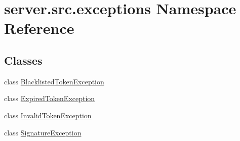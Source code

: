 \hypertarget{namespaceserver_1_1src_1_1exceptions}{}\section{server.\+src.\+exceptions Namespace Reference}
\label{namespaceserver_1_1src_1_1exceptions}
\subsection*{Classes}
\begin{DoxyCompactItemize}
\item 
class \hyperlink{classserver_1_1src_1_1exceptions_1_1_blacklisted_token_exception}{Blacklisted\+Token\+Exception}
\item 
class \hyperlink{classserver_1_1src_1_1exceptions_1_1_expired_token_exception}{Expired\+Token\+Exception}
\item 
class \hyperlink{classserver_1_1src_1_1exceptions_1_1_invalid_token_exception}{Invalid\+Token\+Exception}
\item 
class \hyperlink{classserver_1_1src_1_1exceptions_1_1_signature_exception}{Signature\+Exception}
\end{DoxyCompactItemize}
